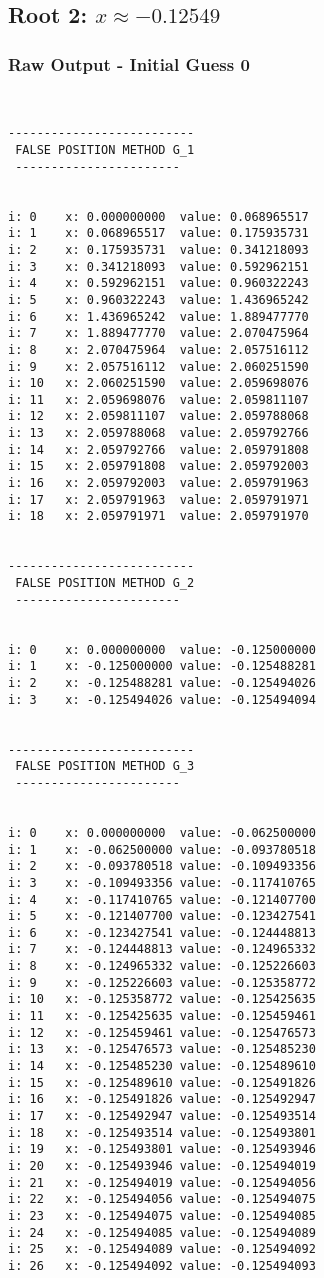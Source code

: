 \documentclass[11pt]{article} %
\begin{document}
\subsection*{Root 2: $x \approx -0.12549$}
\subsubsection*{Raw Output - Initial Guess 0}
\begin{verbatim}
 

--------------------------
 FALSE POSITION METHOD G_1
 -----------------------


i: 0	x: 0.000000000	value: 0.068965517
i: 1	x: 0.068965517	value: 0.175935731
i: 2	x: 0.175935731	value: 0.341218093
i: 3	x: 0.341218093	value: 0.592962151
i: 4	x: 0.592962151	value: 0.960322243
i: 5	x: 0.960322243	value: 1.436965242
i: 6	x: 1.436965242	value: 1.889477770
i: 7	x: 1.889477770	value: 2.070475964
i: 8	x: 2.070475964	value: 2.057516112
i: 9	x: 2.057516112	value: 2.060251590
i: 10	x: 2.060251590	value: 2.059698076
i: 11	x: 2.059698076	value: 2.059811107
i: 12	x: 2.059811107	value: 2.059788068
i: 13	x: 2.059788068	value: 2.059792766
i: 14	x: 2.059792766	value: 2.059791808
i: 15	x: 2.059791808	value: 2.059792003
i: 16	x: 2.059792003	value: 2.059791963
i: 17	x: 2.059791963	value: 2.059791971
i: 18	x: 2.059791971	value: 2.059791970


--------------------------
 FALSE POSITION METHOD G_2
 -----------------------


i: 0	x: 0.000000000	value: -0.125000000
i: 1	x: -0.125000000	value: -0.125488281
i: 2	x: -0.125488281	value: -0.125494026
i: 3	x: -0.125494026	value: -0.125494094


--------------------------
 FALSE POSITION METHOD G_3
 -----------------------


i: 0	x: 0.000000000	value: -0.062500000
i: 1	x: -0.062500000	value: -0.093780518
i: 2	x: -0.093780518	value: -0.109493356
i: 3	x: -0.109493356	value: -0.117410765
i: 4	x: -0.117410765	value: -0.121407700
i: 5	x: -0.121407700	value: -0.123427541
i: 6	x: -0.123427541	value: -0.124448813
i: 7	x: -0.124448813	value: -0.124965332
i: 8	x: -0.124965332	value: -0.125226603
i: 9	x: -0.125226603	value: -0.125358772
i: 10	x: -0.125358772	value: -0.125425635
i: 11	x: -0.125425635	value: -0.125459461
i: 12	x: -0.125459461	value: -0.125476573
i: 13	x: -0.125476573	value: -0.125485230
i: 14	x: -0.125485230	value: -0.125489610
i: 15	x: -0.125489610	value: -0.125491826
i: 16	x: -0.125491826	value: -0.125492947
i: 17	x: -0.125492947	value: -0.125493514
i: 18	x: -0.125493514	value: -0.125493801
i: 19	x: -0.125493801	value: -0.125493946
i: 20	x: -0.125493946	value: -0.125494019
i: 21	x: -0.125494019	value: -0.125494056
i: 22	x: -0.125494056	value: -0.125494075
i: 23	x: -0.125494075	value: -0.125494085
i: 24	x: -0.125494085	value: -0.125494089
i: 25	x: -0.125494089	value: -0.125494092
i: 26	x: -0.125494092	value: -0.125494093

\end{verbatim}
\end{document}
